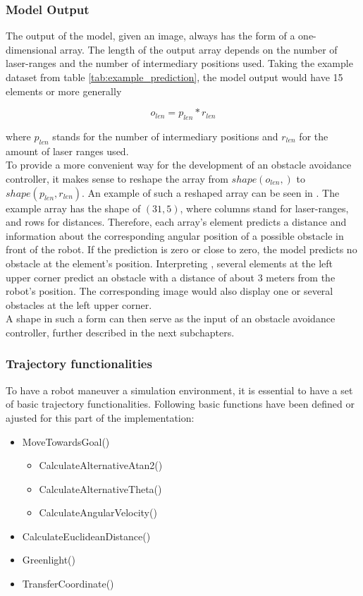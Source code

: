 \subsubsection{Model Output \label{model_output} }
The output of the model, given an image, always has the form of a one-dimensional array. The length of the output array depends on the number of laser-ranges and the number of intermediary positions used. Taking the example dataset from table \ref{tab:example_prediction}, the model output would have 15 elements or more generally

\begin{equation}
\label{eqn:10}
o_{len} = p_{len} * r_{len}
\end{equation}

where $p_{len}$ stands for the number of intermediary positions and $r_{len}$ for the amount of laser ranges used.\\

To provide a more convenient way for the development of an obstacle avoidance controller, it makes sense to reshape the array from $shape(o_{len},)$ to $shape(p_{len},r_{len})$. An example of such a reshaped array can be seen in . The example array has the shape of $(31,5)$, where columns stand for laser-ranges, and rows for distances. Therefore, each array's element predicts a distance and information about the corresponding angular position of a possible obstacle in front of the robot. If the prediction is zero or close to zero, the model predicts no obstacle at the element's position. Interpreting , several elements at the left upper corner predict an obstacle with a distance of about 3 meters from the robot's position. The corresponding image would also display one or several obstacles at the left upper corner.\\

A shape in such a form can then serve as the input of an obstacle avoidance controller, further described in the next subchapters.

\subsubsection{Trajectory functionalities \label{trajectory_functionalities} }
To have a robot maneuver a simulation environment, it is essential to have a set of basic trajectory functionalities. Following basic functions have been defined or ajusted for this part of the implementation:

\begin{itemize}
\item MoveTowardsGoal()
\begin{itemize}
\item CalculateAlternativeAtan2()
\item CalculateAlternativeTheta()
\item CalculateAngularVelocity()
\end{itemize}
\item CalculateEuclideanDistance()
\item Greenlight()
\item TransferCoordinate()
\end{itemize}


